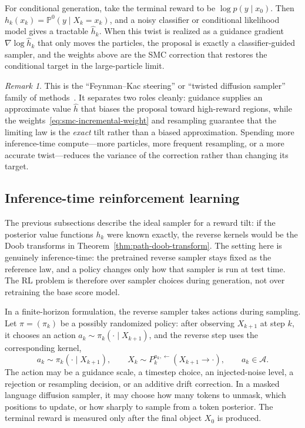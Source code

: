 \documentclass{amsart}
\numberwithin{equation}{section}
\theoremstyle{plain}
\theoremstyle{definition}
\theoremstyle{remark}
\newtheorem*{remark}{Remark}
\newcommand{\Pp}{\mathbb{P}}
\newcommand{\cA}{\mathcal{A}}
\newcommand{\wh}[1]{\widehat{#1}}
\begin{document}
For conditional generation, take the terminal reward to be
$\log p(y\mid x_0)$.  Then
$h_k(x_k)=\Pp^0(y\mid X_k=x_k)$, and a noisy classifier or conditional
likelihood model gives a tractable $\wh h_k$.  When this twist is realized as a
guidance gradient $\nabla\log\wh h_k$ that only moves the particles, the proposal
is exactly a classifier-guided sampler, and the weights above are the SMC
correction that restores the conditional target in the large-particle limit.

\begin{remark}
This is the ``Feynman--Kac steering'' or ``twisted diffusion sampler'' family of
methods~\cite{wu2023twisted}.  It separates two roles cleanly: guidance
supplies an approximate value $\wh h$ that biases the proposal toward
high-reward regions, while the weights~\eqref{eq:smc-incremental-weight} and
resampling guarantee that the limiting law is the \emph{exact} tilt rather than
a biased approximation.  Spending more inference-time compute---more particles,
more frequent resampling, or a more accurate twist---reduces the variance of the
correction rather than changing its target.
\end{remark}

\subsection{Inference-time reinforcement learning}
\label{subsec:inference-rl}

The previous subsections describe the ideal sampler for a reward tilt: if the
posterior value functions $h_k$ were known exactly, the reverse kernels would be
the Doob transforms in Theorem~\ref{thm:path-doob-transform}.  The setting here
is genuinely inference-time: the pretrained reverse sampler stays fixed as the
reference law, and a policy changes only how that sampler is run at test time.
The RL problem is therefore over sampler choices during generation, not over
retraining the base score model.

In a finite-horizon formulation, the reverse sampler takes actions during
sampling.  Let $\pi=(\pi_k)$ be a possibly randomized policy: after observing
$X_{k+1}$ at step $k$, it chooses an action $a_k\sim\pi_k(\cdot\mid X_{k+1})$,
and the reverse step uses the corresponding kernel,
\[
    a_k\sim\pi_k(\cdot\mid X_{k+1}),
    \qquad
    X_k\sim P_k^{a_k,\leftarrow}(X_{k+1}\to\cdot),
    \qquad
    a_k\in\cA.
\]
The action may be a guidance scale, a timestep choice, an injected-noise level,
a rejection or resampling decision, or an additive drift correction.  In a
masked language diffusion sampler, it may choose how many tokens to unmask,
which positions to update, or how sharply to sample from a token posterior.
The terminal reward is measured only after the final object $X_0$ is produced.
\end{document}
